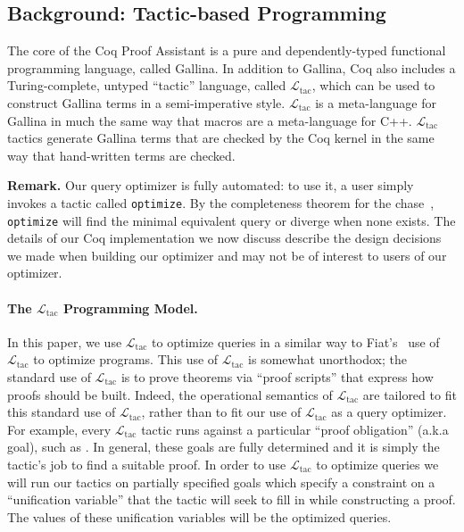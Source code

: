 \documentclass[preprint]{sigplanconf}
\newcommand{\ltac}[0]{\ensuremath{\mathcal{L}_{\mathrm{tac}}}}
\begin{document}

\subsection{Background: Tactic-based Programming}
\label{sec:tactic-based}

The core of the Coq Proof Assistant is a pure and dependently-typed functional programming language, called Gallina.  In addition to Gallina, Coq also includes a Turing-complete, untyped ``tactic'' language, called \ltac{}, which can be used to construct Gallina terms in a semi-imperative style. 
\ltac{} is a meta-language for Gallina in much the same way that macros are a meta-language for C++.
\ltac{} tactics generate Gallina terms that are checked by the Coq kernel in the same way that hand-written terms are checked.

\textbf{Remark.}
Our query optimizer is fully automated: to use it, a user simply invokes a tactic called {\tt optimize}.
By the completeness theorem for the chase~\cite{Popa99anequational}, {\tt optimize} will find the minimal equivalent query or diverge when none exists.  The details of our Coq implementation we now discuss describe the design decisions we made when building our optimizer and may not be of interest to users of our optimizer.

\paragraph{The \ltac{} Programming Model.}
In this paper, we use \ltac{} to optimize queries in a similar way to Fiat's~\cite{DBLP:conf/popl/DelawarePGC15} use of \ltac{} to optimize programs.
This use of \ltac{} is somewhat unorthodox; the standard use of \ltac{} is to prove theorems via ``proof scripts'' that express how proofs should be built.
Indeed, the operational semantics of \ltac{} are tailored to fit this standard use of \ltac{}, rather than to fit our use of \ltac{} as a query optimizer.
For example, every \ltac{} tactic runs against a particular ``proof obligation'' (a.k.a goal), such as .
In general, these goals are fully determined and it is simply the tactic's job to find a suitable proof.
In order to use \ltac{} to optimize queries we will run our tactics on partially specified goals which specify a constraint on a ``unification variable'' that the tactic will seek to fill in while constructing a proof.
The values of these unification variables will be the optimized queries.
\end{document}
